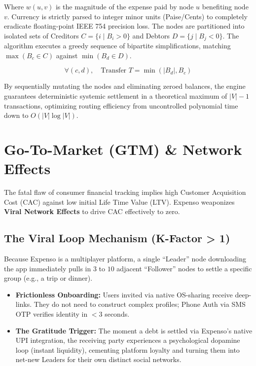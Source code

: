 \documentclass[11pt, letterpaper]{article}
\begin{document}
Where $w(u,v)$ is the magnitude of the expense paid by node $u$ benefiting node $v$. Currency is strictly parsed to integer minor units (Paise/Cents) to completely eradicate floating-point IEEE 754 precision loss. The nodes are partitioned into isolated sets of Creditors $C = \{i \mid B_i > 0\}$ and Debtors $D = \{j \mid B_j < 0\}$. The algorithm executes a greedy sequence of bipartite simplifications, matching $\max(B_c \in C)$ against $\min(B_d \in D)$.

\begin{equation}
\forall (c, d), \quad \text{Transfer } T = \min(|B_d|, B_c)
\end{equation}

By sequentially mutating the nodes and eliminating zeroed balances, the engine guarantees deterministic systemic settlement in a theoretical maximum of $|V| - 1$ transactions, optimizing routing efficiency from uncontrolled polynomial time down to $O(|V| \log |V|)$. 

\section{Go-To-Market (GTM) \& Network Effects}
The fatal flaw of consumer financial tracking implies high Customer Acquisition Cost (CAC) against low initial Life Time Value (LTV). Expenso weaponizes \textbf{Viral Network Effects} to drive CAC effectively to zero.

\subsection{The Viral Loop Mechanism (K-Factor > 1)}
Because Expenso is a multiplayer platform, a single ``Leader'' node downloading the app immediately pulls in $3$ to $10$ adjacent ``Follower'' nodes to settle a specific group (e.g., a trip or dinner). 
\begin{itemize}
    \item \textbf{Frictionless Onboarding:} Users invited via native OS-sharing receive deep-links. They do not need to construct complex profiles; Phone Auth via SMS OTP verifies identity in $<3$ seconds.
    \item \textbf{The Gratitude Trigger:} The moment a debt is settled via Expenso's native UPI integration, the receiving party experiences a psychological dopamine loop (instant liquidity), cementing platform loyalty and turning them into net-new Leaders for their own distinct social networks.
\end{itemize}
\end{document}

